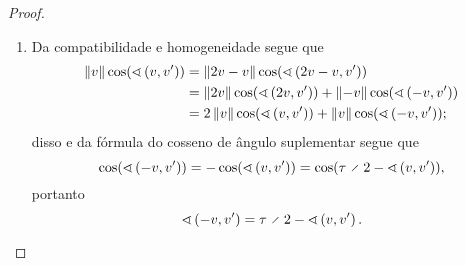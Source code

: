 \begin{proof}
\begin{enumerate}
		\item Da compatibilidade e homogeneidade segue que
			\begin{align*}
				\left\Vert{v}\right\Vert\cos(\sphericalangle\left({v},{v'}\right)) &= \left\Vert{2v-v}\right\Vert\cos(\sphericalangle\left({2v-v},{v'}\right)) \\
					&= \left\Vert{2v}\right\Vert\cos(\sphericalangle\left({2v},{v'}\right)) + \left\Vert{-v}\right\Vert\cos(\sphericalangle\left({-v},{v'}\right)) \\
					&= 2\left\Vert{v}\right\Vert\cos(\sphericalangle\left({v},{v'}\right)) + \left\Vert{v}\right\Vert\cos(\sphericalangle\left({-v},{v'}\right));
			\end{align*}
		disso e da fórmula do cosseno de ângulo suplementar segue que
			\begin{equation*}
				\cos(\ang{-v}{v'}) = -\cos(\ang{v}{v'}) = \cos(\tau \div 2 - \ang{v}{v'}),
			\end{equation*}
		portanto
			\begin{equation*}
				\ang{-v}{v'} = \tau \div 2 - \ang{v}{v'}.
			\end{equation*}
	\end{enumerate}
\end{proof}

